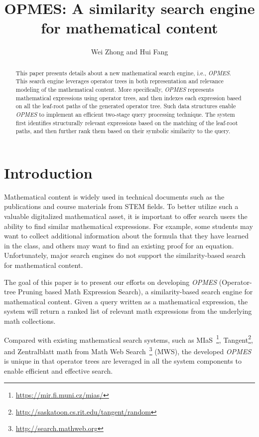 \documentclass{llncs}
\begin{document}
\title{OPMES: A similarity search engine for mathematical content}
\author{Wei Zhong and Hui Fang}
\maketitle
%
\begin{abstract}
This paper presents details about a new mathematical search engine, 
i.e., {\em OPMES}. This search engine leverages operator trees 
in both representation and relevance modeling of the mathematical 
content. More specifically, {\em OPMES} represents
mathematical expressions using operator trees, and then 
indexes each expression based on all the leaf-root paths of the generated
operator tree.  Such data structures enable {\em OPMES} to implement an 
efficient two-stage query processing technique. The system first 
identifies structurally relevant expressions based on the matching of the 
leaf-root paths, and then further rank them based on their symbolic
similarity to the query. 
\end{abstract}

\section{Introduction}

Mathematical content is widely used in technical documents such as 
the publications and course materials from STEM fields. 
To better utilize such a valuable digitalized mathematical asset, 
it is important to offer search users the ability to find similar 
mathematical expressions. For example, some students may want to collect
additional information about the formula that they have learned in 
the class, and others may want to find an existing proof for an equation. 
Unfortunately, major search engines do not support the similarity-based
search for mathematical content.  

The goal of this paper is to present our efforts on developing 
{\em OPMES} (Operator-tree Pruning based Math Expression Search), 
a similarity-based search engine for mathematical content. 
Given a query written as a mathematical expression, 
the system will return a ranked list of relevant math expressions 
from the underlying math collections. 

Compared with existing mathematical search systems, such as 
MIaS~\footnote{\url{https://mir.fi.muni.cz/mias/}}, 
Tangent\footnote{\url{http://saskatoon.cs.rit.edu/tangent/random}},
and Zentralblatt math from Math Web Search~\footnote{\url{http://search.mathweb.org}} (MWS), 
the developed {\em OPMES} is unique in that operator trees
\cite{goodsurvey} are 
leveraged in all the system components to enable efficient 
and effective search. 
\end{document}
